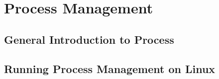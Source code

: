 \chapter{Process Management}


\section{General Introduction to Process}

\section{Running Process Management on Linux}
















